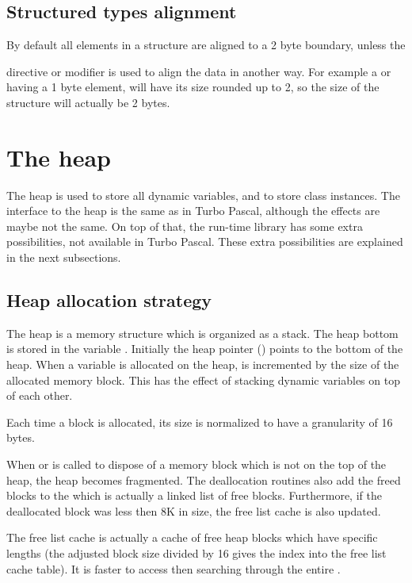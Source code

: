 \subsection{Structured types alignment}
\label{se:StructuredAlignment}

By default all elements in a structure are aligned to a 2 byte boundary,
unless the { directive or  modifier is used
to align the data in another way. For example a  or 
having a 1 byte element, will have its size rounded up to 2, so the size of
the structure will actually be 2 bytes.

\section{The heap}
\label{se:Heap}
The heap is used to store all dynamic variables, and to store class
instances. The interface to the heap is the same as in Turbo Pascal,
although the effects are maybe not the same. On top of that, the \fpc
run-time library has some extra possibilities, not available in Turbo
Pascal. These extra possibilities are explained in the next subsections.

\subsection{Heap allocation strategy}


The heap is a memory structure which is organized as a stack. The heap
bottom is stored in the variable . Initially the heap
pointer () points to the bottom of the heap. When a
variable is allocated on the heap,  is incremented by the
size of the allocated memory block. This has the effect of stacking
dynamic variables on top of each other.

Each time a block is allocated, its size is normalized to have
a granularity of 16 bytes.

When  or  is called to dispose of a
memory block which is not on the top of the heap, the heap becomes
fragmented. The deallocation routines also add the freed blocks to
the  which is actually a linked list of free blocks.
Furthermore, if the deallocated block was less then 8K in size, the
free list cache is also updated.

The free list cache is actually a cache of free heap blocks which
have specific lengths (the adjusted block size divided by 16 gives the
index into the free list cache table). It is faster to access then
searching through the entire .

}
